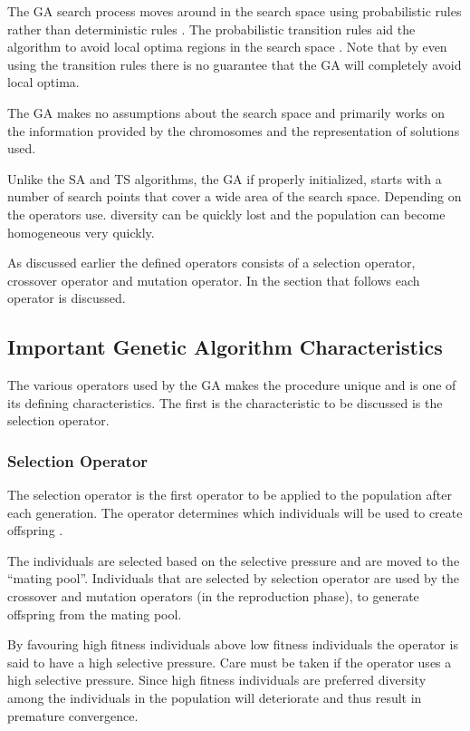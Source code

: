 The GA search process moves around in the search space using probabilistic rules rather than deterministic rules \cite{FamilyGA}. The probabilistic transition rules aid the algorithm to avoid local optima regions in the search space \cite{HybridIntelliGA}. Note that by even using the transition rules there is no guarantee that the GA will completely avoid local optima\cite{CompuIntelligenceIntro}.

The GA makes no assumptions about the search space and primarily works on the information provided by the chromosomes and the representation of solutions used\cite{CompuIntelligenceIntro,ConstrainedGA,HybridIntelliGA}. 

Unlike the SA and TS algorithms, the GA if properly initialized, starts with a number of search points that cover a wide area of the search space. Depending on the operators use. diversity can be quickly lost and the population can become homogeneous very quickly\cite{DistributedHierarchicalGA,FamilyGA,HybridIntelliGA}\label{GASearchPoints}.

As discussed earlier the defined operators consists of a selection operator, crossover operator and mutation operator\cite{SelfAdaptiveGA,MultiPopGA}. In the section that follows each operator is discussed.

\subsection{Important Genetic Algorithm Characteristics}
The various operators used by the GA makes the procedure unique and is one of its defining characteristics. The first is the characteristic to be discussed is the selection operator.

\subsubsection{Selection Operator}
The selection operator is the first operator to be applied to the population after each generation. The operator determines which individuals will be used to create offspring \cite{CoactiveFuzzyGA,CombinedBranchBoundGA,ConstrainedGA}.

The individuals are selected based on the selective pressure and are moved to the ``mating pool''. Individuals that are selected by selection operator are used by the crossover and mutation operators (in the reproduction phase), to generate offspring from the mating pool\cite{AdaptiveSAGA,AcceleratingGA}.

By favouring high fitness individuals above low fitness individuals the operator is said to have a high selective pressure\cite{CompuIntelligenceIntro}. Care must be taken if the operator uses a high selective pressure. Since high fitness individuals are preferred diversity among the individuals in the population will deteriorate and thus result in premature convergence\cite{ConstrainedGA, CompuIntelligenceIntro}.

